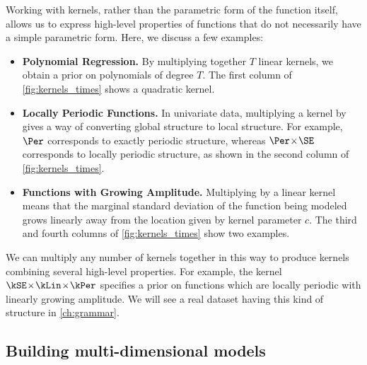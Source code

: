 Working with kernels, rather than the parametric form of the function itself, allows us to express high-level properties of functions that do not necessarily have a simple parametric form.
Here, we discuss a few examples:

\begin{itemize}
\item {\bf Polynomial Regression.}
By multiplying together $T$ linear kernels, we obtain a prior on polynomials of degree $T$.
The first column of \cref{fig:kernels_times} shows a quadratic kernel.

\item {\bf Locally Periodic Functions.}
In univariate data, multiplying a kernel by \kSE{} gives a way of converting global structure to local structure.
For example, $\Per$ corresponds to exactly periodic structure, whereas $\Per \kerntimes \SE$ corresponds to locally periodic structure, as shown in the second column of \cref{fig:kernels_times}.

\item {\bf Functions with Growing Amplitude.}
Multiplying by a linear kernel means that the marginal standard deviation of the function being modeled grows linearly away from the location given by kernel parameter $c$.
The third and fourth columns of \cref{fig:kernels_times} show two examples.
\end{itemize}

We can multiply any number of kernels together in this way to produce kernels combining several high-level properties.
For example, the kernel $\kSE \kerntimes \kLin \kerntimes \kPer$ specifies a prior on functions which are locally periodic with linearly growing amplitude.
We will see a real dataset having this kind of structure in \cref{ch:grammar}.


\subsection{Building multi-dimensional models}


